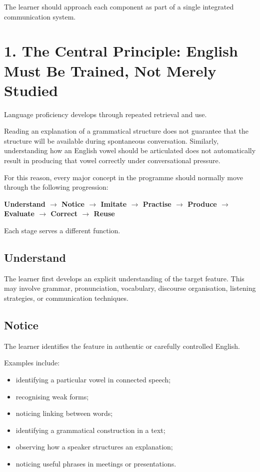 The learner should approach each component as part of a single integrated communication system.

\section*{1. The Central Principle: English Must Be Trained, Not Merely Studied}

Language proficiency develops through repeated retrieval and use.

Reading an explanation of a grammatical structure does not guarantee that the structure will be available during spontaneous conversation. Similarly, understanding how an English vowel should be articulated does not automatically result in producing that vowel correctly under conversational pressure.

For this reason, every major concept in the programme should normally move through the following progression:

\begin{center}
\textbf{Understand $\rightarrow$ Notice $\rightarrow$ Imitate $\rightarrow$ Practise $\rightarrow$ Produce $\rightarrow$ Evaluate $\rightarrow$ Correct $\rightarrow$ Reuse}
\end{center}

Each stage serves a different function.

\subsection*{Understand}

The learner first develops an explicit understanding of the target feature. This may involve grammar, pronunciation, vocabulary, discourse organisation, listening strategies, or communication techniques.

\subsection*{Notice}

The learner identifies the feature in authentic or carefully controlled English.

Examples include:

\begin{itemize}
    \item identifying a particular vowel in connected speech;
    \item recognising weak forms;
    \item noticing linking between words;
    \item identifying a grammatical construction in a text;
    \item observing how a speaker structures an explanation;
    \item noticing useful phrases in meetings or presentations.
\end{itemize}

